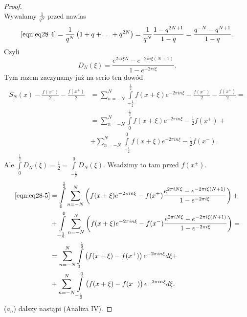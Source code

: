 \documentclass[../main.tex]{subfiles}
\begin{document}
\begin{proof}
\begin{equation}
\end{equation}
Wywalamy $\frac{1}{q^N}$ przed nawias
\[
    \eqref{eqn:eq28-4} = \frac{1}{q^N}\left( 1 + q + \ldots + q^{2N} \right) = \frac{1}{q^N}\frac{1-q^{2N + 1}}{1-q} = \frac{q^{-N} - q^{N+1}}{1-q}
.\]
Czyli
\[
    D_N(\xi) = \frac{e^{2\pi i \xi N} - e^{-2\pi i \xi (N + 1)}}{1 - e^{-2\pi i \xi}}
.\]
Tym razem zaczynamy już na serio ten dowód
\begin{align}
    S_N(x) - \frac{f(x^-)}{2} - \frac{f(x^+)}{2} &= \sum_{n=-N}^{N} \int\limits_{-\frac{1}{2}}^{\frac{1}{2}} f(x+\xi) e^{-2\pi i n \xi} - \frac{f(x^-)}{2} - \frac{f(x^+)}{2} =\nonumber \\
    &= \sum_{n=-N}^{N} \int\limits_{0}^{\frac{1}{2}} f(x+\xi) e^{-2\pi i n \xi} - \frac{1}{2} f(x^+) +\nonumber \\
    \label{eqn:eq28-5}
    &+ \sum_{n=-N}^{N} \int\limits_{-\frac{1}{2}}^{0} f(x+\xi)e^{-2\pi i n \xi} - \frac{1}{2} f(x^-) \tag{$\Delta \star \Delta$}
.\end{align}
    Ale $\int\limits_{0}^{\frac{1}{2}} D_N(\xi)  = \frac{1}{2} = \int\limits_{-\frac{1}{2}}^{0} D_N(\xi)$. Wsadzimy to tam przed $f(x^{\pm})$.
    \begin{align*}
        \eqref{eqn:eq28-5} &= \int\limits_{0}^{\frac{1}{2}} \sum_{n=-N}^{N} \left( f(x+\xi)e^{-2\pi i n \xi} - f(x^+) \frac{e^{2\pi i N \xi} - e^{-2\pi i \xi (N+1)}}{1-e^{-2\pi i \xi}}\right) + \\
        &+ \int\limits_{-\frac{1}{2}}^{0} \sum_{n=-N}^{N}\left( f(x+\xi) e^{-2\pi i n \xi} - f(x^-) \frac{e^{2\pi i N\xi} - e^{-2\pi i \xi(N+1)}}{1-e^{-2\pi i \xi}}\right) =\\
        &= \sum_{n=-N}^{N} \int\limits_{0}^{\frac{1}{2}} \left( f(x+\xi) - f(x^+) \right) e^{-2\pi i n \xi}d\xi +\\
        &+ \sum_{n=-N}^{N} \int\limits_{-\frac{1}{2}}^{0} \left( f(x+\xi) - f(x^-) \right) e^{-2\pi i n \xi}d\xi
    .\end{align*}
    ($a_n$) dalszy nastąpi (Analiza IV).

\end{proof}
\end{document}
